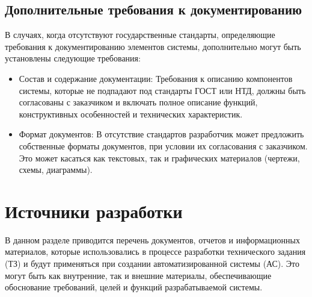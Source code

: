 \subsection{Дополнительные требования к документированию}
В случаях, когда отсутствуют государственные стандарты, определяющие требования к документированию элементов системы, дополнительно могут быть установлены следующие требования:
\begin{itemize}
    \item Состав и содержание документации: Требования к описанию компонентов системы, которые не подпадают под стандарты ГОСТ или НТД, должны быть согласованы с заказчиком и включать полное описание функций, конструктивных особенностей и технических характеристик.
    \item Формат документов: В отсутствие стандартов разработчик может предложить собственные форматы документов, при условии их согласования с заказчиком. Это может касаться как текстовых, так и графических материалов (чертежи, схемы, диаграммы).
\end{itemize}

\section{Источники разработки}

В данном разделе приводится перечень документов, отчетов и информационных материалов, которые использовались в процессе разработки технического задания (ТЗ) и будут применяться при создании автоматизированной системы (АС). Это могут быть как внутренние, так и внешние материалы, обеспечивающие обоснование требований, целей и функций разрабатываемой системы.

